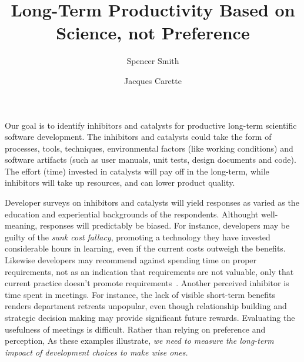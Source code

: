 \documentclass[sigconf, authorversion, nonacm]{acmart}
\begin{document}
\title{Long-Term Productivity Based on Science, not Preference}

\author{Spencer Smith}

\author{Jacques Carette}

\maketitle

Our goal is to identify inhibitors and catalysts for productive long-term
scientific software development.  The inhibitors and catalysts could take the
form of processes, tools, techniques, environmental factors (like working
conditions) and software artifacts (such as user manuals, unit tests, design
documents and code). The effort (time) invested in catalysts will pay off in
the long-term, while inhibitors will take up resources, and can lower product
quality.

Developer surveys on inhibitors and catalysts will yield responses as
varied as the education and experiential backgrounds of the respondents. 
Althought well-meaning, responses will predictably be biased.
For instance, developers may be guilty of the \emph{sunk cost fallacy},
promoting a technology they have invested considerable hours in learning,
even if the current costs outweigh the benefits. Likewise developers
may recommend against spending time on proper requirements, not as an
indication that requirements are not valuable, only that current practice
doesn't promote requirements~\cite{HeatonAndCarver2015}. Another perceived
inhibitor is time spent in meetings. For instance, the lack of visible
short-term benefits renders department retreats unpopular, even though
relationship building and strategic decision making may provide significant
future rewards. Evaluating the usefulness of meetings is difficult.
Rather than relying on preference and perception,
As these examples illustrate, \emph{we need to measure the long-term impoact
of development choices to make wise ones.}
\end{document}

